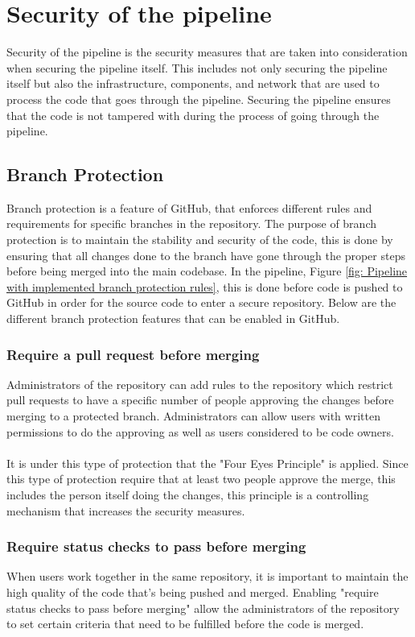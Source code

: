 \section{Security of the pipeline}
\label{Security of the pipeline}
Security of the pipeline is the security measures that are taken into consideration when securing the pipeline itself. This includes not only securing the pipeline itself but also the infrastructure, components, and network that are used to process the code that goes through the pipeline. Securing the pipeline ensures that the code is not tampered with during the process of going through the pipeline. 


\subsection{Branch Protection}
\label{branchprotection}
Branch protection is a feature of GitHub, that enforces different rules and requirements for specific branches in the repository. The purpose of branch protection is to maintain the stability and security of the code, this is done by ensuring that all changes done to the branch have gone through the proper steps before being merged into the main codebase. In the pipeline, Figure \ref{fig: Pipeline with implemented branch protection rules}, this is done before code is pushed to GitHub in order for the source code to enter a secure repository. Below are the different branch protection features that can be enabled in GitHub. \cite{ProtectedBranches}

\subsubsection{Require a pull request before merging}
Administrators of the repository can add rules to the repository which restrict pull requests to have a specific number of people approving the changes before merging to a protected branch. Administrators can allow users with written permissions to do the approving as well as users considered to be code owners. 
\\~\\
It is under this type of protection that the "Four Eyes Principle" is applied. Since this type of protection require that at least two people approve the merge, this includes the person itself doing the changes, this principle is a controlling mechanism that increases the security measures. 

\subsubsection{Require status checks to pass before merging}
When users work together in the same repository, it is important to maintain the high quality of the code that's being pushed and merged. Enabling "require status checks to pass before merging" allow the administrators of the repository to set certain criteria that need to be fulfilled before the code is merged. 


